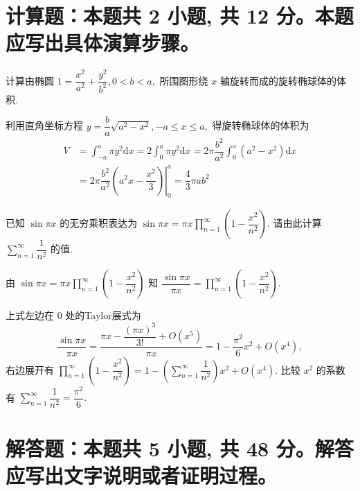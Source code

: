 \section{计算题：本题共 2 小题, 共 12 分。本题应写出具体演算步骤。}


\begin{question}[points = 6]
  计算由椭圆 $1 = \dfrac{x^2}{a^2} + \dfrac{y^2}{b^2}, 0 < b < a,$ 所围图形绕 $x$ 轴旋转而成的旋转椭球体的体积.

\end{question}

\begin{solution}
  利用直角坐标方程 $y = \dfrac{b}{a} \sqrt{a^2 - x^2}, -a \leqslant x \leqslant a,$ 得旋转椭球体的体积为
  \begin{align*}
    V & = \int_{-a}^a \pi y^2 \mathrm{d} x = 2 \int_0^a \pi y^2 \mathrm{d} x = 2 \pi \dfrac{b^2}{a^2} \int_0^a (a^2 - x^2) \mathrm{d} x \\
    & = 2 \pi \dfrac{b^2}{a^2} \left. \left( a^2x - \dfrac{x^2}{3} \right) \right|_0^a = \dfrac{4}{3} \pi ab^2
  \end{align*}
\end{solution}

\begin{question}[points = 6]
  已知 $\sin \pi x$ 的无穷乘积表达为 $\sin \pi x = \pi x \prod\limits_{n=1}^{\infty} \left( 1 - \dfrac{x^2}{n^2} \right).$ 请由此计算 $\sum\limits_{n=1}^{\infty} \dfrac{1}{n^2}$ 的值.

\end{question}

\begin{solution}
  由 $\sin \pi x = \pi x \prod\limits_{n=1}^{\infty} \left( 1 - \dfrac{x^2}{n^2} \right)$ 知 $\dfrac{\sin \pi x}{\pi x} = \prod\limits_{n=1}^{\infty} \left( 1 - \dfrac{x^2}{n^2} \right).$

  上式左边在 $0$ 处的Taylor展式为
  $$\dfrac{\sin \pi x}{\pi x} = \dfrac{\pi x - \dfrac{(\pi x)^3}{3!} + O(x^5)}{\pi x} = 1 - \dfrac{\pi^2}{6} x^2 + O(x^4), $$
  右边展开有 $\prod\limits_{n=1}^{\infty} \left( 1 - \dfrac{x^2}{n^2} \right) = 1 - \left( \sum\limits_{n=1}^{\infty} \dfrac{1}{n^2} \right) x^2 + O(x^4).$ 比较 $x^2$ 的系数有 $\sum\limits_{n=1}^{\infty} \dfrac{1}{n^2} = \dfrac{\pi^2}{6}.$
\end{solution}


\section{解答题：本题共 5 小题, 共 48 分。解答应写出文字说明或者证明过程。}

